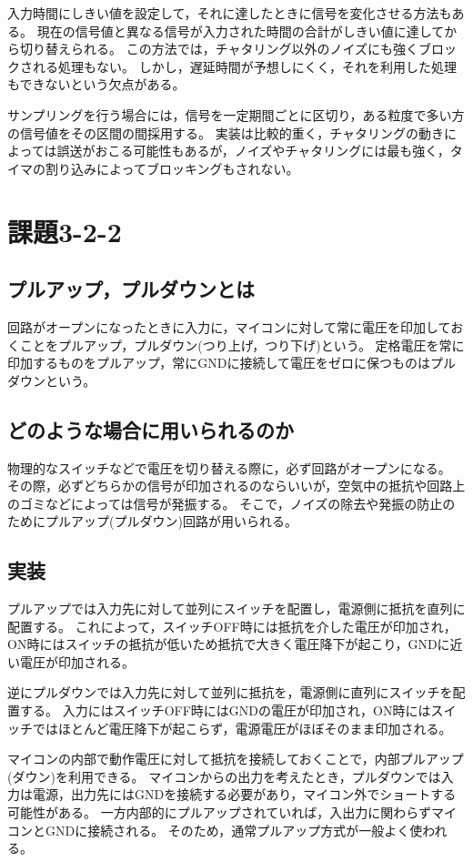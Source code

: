 \documentclass[a4paper,10pt]{jsarticle}
\begin{document}
入力時間にしきい値を設定して，それに達したときに信号を変化させる方法もある。
現在の信号値と異なる信号が入力された時間の合計がしきい値に達してから切り替えられる。
この方法では，チャタリング以外のノイズにも強くブロックされる処理もない。
しかし，遅延時間が予想しにくく，それを利用した処理もできないという欠点がある。

サンプリングを行う場合には，信号を一定期間ごとに区切り，ある粒度で多い方の信号値をその区間の間採用する。
実装は比較的重く，チャタリングの動きによっては誤送がおこる可能性もあるが，ノイズやチャタリングには最も強く，タイマの割り込みによってブロッキングもされない。

\section{課題3-2-2}
\subsection*{プルアップ，プルダウンとは}
回路がオープンになったときに入力に，マイコンに対して常に電圧を印加しておくことをプルアップ，プルダウン(つり上げ，つり下げ)という。
定格電圧を常に印加するものをプルアップ，常にGNDに接続して電圧をゼロに保つものはプルダウンという。\cite{cpuno}

\subsection*{どのような場合に用いられるのか}
物理的なスイッチなどで電圧を切り替える際に，必ず回路がオープンになる。
その際，必ずどちらかの信号が印加されるのならいいが，空気中の抵抗や回路上のゴミなどによっては信号が発振する。
そこで，ノイズの除去や発振の防止のためにプルアップ(プルダウン)回路が用いられる。\cite{cpuno}

\subsection*{実装}
プルアップでは入力先に対して並列にスイッチを配置し，電源側に抵抗を直列に配置する。
これによって，スイッチOFF時には抵抗を介した電圧が印加され，ON時にはスイッチの抵抗が低いため抵抗で大きく電圧降下が起こり，GNDに近い電圧が印加される。

逆にプルダウンでは入力先に対して並列に抵抗を，電源側に直列にスイッチを配置する。
入力にはスイッチOFF時にはGNDの電圧が印加され，ON時にはスイッチではほとんど電圧降下が起こらず，電源電圧がほぼそのまま印加される。\cite{cpuno}

マイコンの内部で動作電圧に対して抵抗を接続しておくことで，内部プルアップ(ダウン)を利用できる。
マイコンからの出力を考えたとき，プルダウンでは入力は電源，出力先にはGNDを接続する必要があり，マイコン外でショートする可能性がある。
一方内部的にプルアップされていれば，入出力に関わらずマイコンとGNDに接続される。
そのため，通常プルアップ方式が一般よく使われる。
\end{document}
